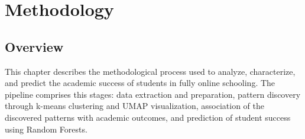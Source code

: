 \chapter{Methodology}
\label{chap:methodology}


\section{Overview}
\label{sec:methodology-overview}
This chapter describes the methodological process used to analyze, characterize, and predict the academic success of students in fully online schooling.
The pipeline comprises this stages: data extraction and preparation, pattern discovery through k-means clustering and UMAP visualization, association of the discovered patterns with academic outcomes, and prediction of student success using Random Forests.

